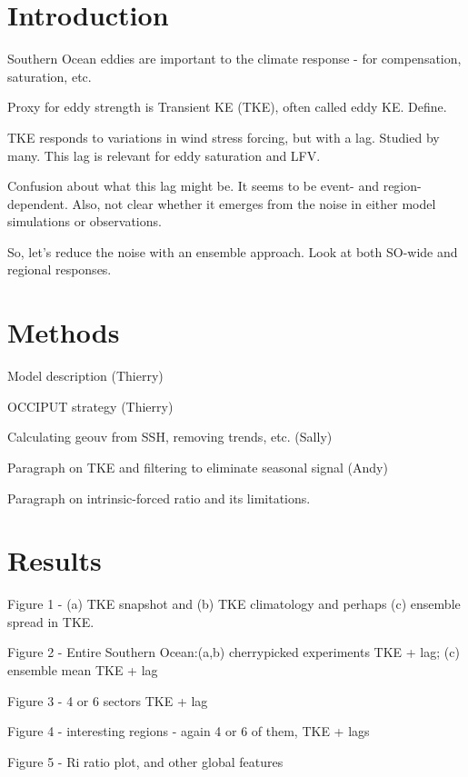 \documentclass{agujournal2019-navid}
\begin{document}
%
%

\section{Introduction}

Southern Ocean eddies are important to the climate response - for compensation, saturation, etc.

Proxy for eddy strength is Transient KE (TKE), often called eddy KE. Define.

TKE responds to variations in wind stress forcing, but with a lag. Studied by many. This lag is relevant for eddy saturation and LFV.

Confusion about what this lag might be. It seems to be event- and region-dependent. Also, not clear whether it emerges from the noise in either model simulations or observations.

So, let’s reduce the noise with an ensemble approach. Look at both SO-wide and regional responses.


\section{Methods}

Model description (Thierry)

OCCIPUT strategy (Thierry)

Calculating geouv from SSH, removing trends, etc. (Sally)

Paragraph on TKE and filtering  to eliminate seasonal signal (Andy)

Paragraph on intrinsic-forced ratio and its limitations.


\section{Results}
Figure 1 - (a) TKE snapshot and (b) TKE climatology and perhaps (c) ensemble spread in TKE.

Figure 2 - Entire Southern Ocean:(a,b) cherrypicked experiments TKE + lag; (c) ensemble mean TKE + lag

Figure 3 - 4 or 6 sectors TKE + lag

Figure 4 - interesting regions - again 4 or 6 of them, TKE + lags

Figure 5 - Ri ratio plot, and other global features
\end{document}
